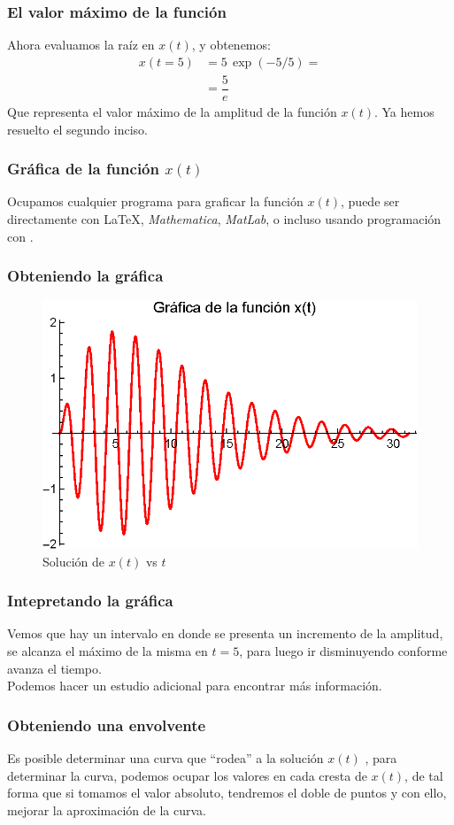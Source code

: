 \begin{frame}
\frametitle{El valor máximo de la función}
Ahora evaluamos la raíz en $x(t)$, y obtenemos:
\begin{align*}
x(t=5) &= 5 \, \exp (-5/5) = \\[0.5em]
&= \dfrac{5}{e}
\end{align*}
Que representa el valor máximo de la amplitud de la función $x(t)$. \pause Ya hemos resuelto el segundo inciso.
\end{frame}
\begin{frame}
\frametitle{Gráfica de la función $x(t)$}
Ocupamos cualquier programa para graficar la función $x(t)$, puede ser directamente con \LaTeX, \emph{Mathematica}, \emph{MatLab}, o incluso usando programación con  \python.
\end{frame}
\begin{frame}
\frametitle{Obteniendo la gráfica}
\begin{figure}
    \centering
    \includegraphics[scale=1]{Imagenes/Ejemplo_Resonancia_01.eps}
    \caption{Solución de $x(t)$ vs $t$}
\end{figure}
\end{frame}
\begin{frame}
\frametitle{Intepretando la gráfica}
Vemos que hay un intervalo en donde se presenta un incremento de la amplitud, se alcanza el máximo de la misma en $t = 5$, para luego ir disminuyendo conforme avanza el tiempo.
\\
\bigskip
\pause
Podemos hacer un estudio adicional para encontrar más información.
\end{frame}
\begin{frame}
\frametitle{Obteniendo una envolvente}
Es posible determinar una curva que \enquote{rodea} a la solución $x(t)$ \pause, para determinar la curva, podemos ocupar los valores en cada cresta de $x(t)$, de tal forma que si tomamos el valor absoluto, tendremos el doble de puntos y con ello, mejorar la aproximación de la curva.
\end{frame}
